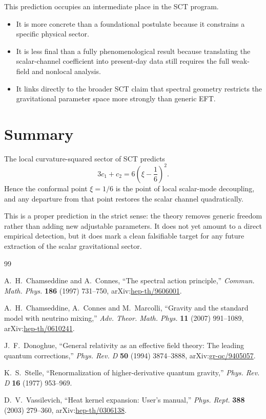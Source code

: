 \documentclass[11pt,a4paper]{article}
\begin{document}
This prediction occupies an intermediate place in the SCT program.

\begin{itemize}
  \item It is more concrete than a foundational postulate because it constrains
  a specific physical sector.
  \item It is less final than a fully phenomenological result because
  translating the scalar-channel coefficient into present-day data still
  requires the full weak-field and nonlocal analysis.
  \item It links directly to the broader SCT claim that spectral geometry
  restricts the gravitational parameter space more strongly than generic EFT.
\end{itemize}

\section{Summary}
\label{sec:summary}

The local curvature-squared sector of SCT predicts
\[
  3c_1 + c_2 = 6\left(\xi - \frac{1}{6}\right)^2.
\]
Hence the conformal point $\xi = 1/6$ is the point of local scalar-mode
decoupling, and any departure from that point restores the scalar channel
quadratically.

This is a proper prediction in the strict sense: the theory removes generic
freedom rather than adding new adjustable parameters.  It does not yet amount
to a direct empirical detection, but it does mark a clean falsifiable target
for any future extraction of the scalar gravitational sector.

\begin{thebibliography}{99}

A.~H.~Chamseddine and A.~Connes,
``The spectral action principle,''
\emph{Commun. Math. Phys.} \textbf{186} (1997) 731--750,
arXiv:\href{https://arxiv.org/abs/hep-th/9606001}{hep-th/9606001}.

A.~H.~Chamseddine, A.~Connes and M.~Marcolli,
``Gravity and the standard model with neutrino mixing,''
\emph{Adv. Theor. Math. Phys.} \textbf{11} (2007) 991--1089,
arXiv:\href{https://arxiv.org/abs/hep-th/0610241}{hep-th/0610241}.

J.~F.~Donoghue,
``General relativity as an effective field theory: The leading quantum
corrections,''
\emph{Phys. Rev. D} \textbf{50} (1994) 3874--3888,
arXiv:\href{https://arxiv.org/abs/gr-qc/9405057}{gr-qc/9405057}.

K.~S.~Stelle,
``Renormalization of higher-derivative quantum gravity,''
\emph{Phys. Rev. D} \textbf{16} (1977) 953--969.

D.~V.~Vassilevich,
``Heat kernel expansion: User's manual,''
\emph{Phys. Rept.} \textbf{388} (2003) 279--360,
arXiv:\href{https://arxiv.org/abs/hep-th/0306138}{hep-th/0306138}.

\end{thebibliography}
\end{document}
